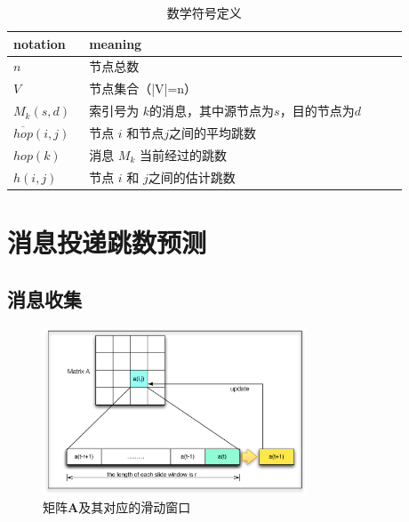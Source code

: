 \begin{table}[tbp]
  \caption{数学符号定义}
  \label{tab:chap5_math_table}
\centering
  \begin{tabular}{p{0.15\linewidth}<{\centering}p{0.73\linewidth}<{\centering}}
  \hline
   \textbf{notation} & \textbf{meaning}  \\
    \hline
    $n$ & 节点总数\\ 
    $V$ & 节点集合（|V|=n）\\ 
    $M_k(s,d)$ & 索引号为 $k$的消息，其中源节点为$s$，目的节点为$d$\\   
    $\overline{hop}(i,j)$ & 节点 $i$ 和节点$j$之间的平均跳数 \\ 
    $hop(k)$ & 消息 $M_k$ 当前经过的跳数\\
    $h(i,j)$ & 节点 $i$ 和 $j$之间的估计跳数 \\
    \hline
  \end{tabular}
\end{table}


\section{消息投递跳数预测}
\label{chap5:消息投递跳数预测}

\subsection{消息收集}
\label{chap5:消息收集}

\begin{figure}[bt]
  \centering\includegraphics[width=0.7\textwidth]{paper-HCH/matrix}
  \caption{矩阵$\bm{A}$及其对应的滑动窗口}
  \label{fig:chap5_matrix}
\end{figure}

